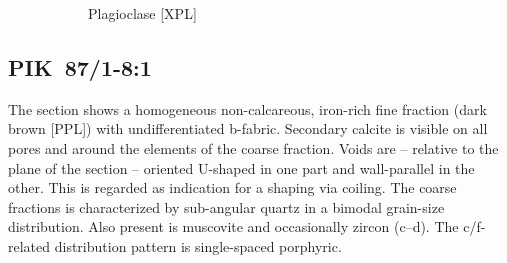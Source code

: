 \documentclass[a4paper]{article}
\begin{document}
\begin{figure}[H]
\begin{subfigure}[t]{.24\textwidth}
		\caption{Plagioclase [XPL]}
	\end{subfigure}
	\caption{}
	\label{fig:4_pik}
\end{figure}

\newpage\subsection{PIK~87/1-8:1 \citep[pik\#5; Fig.~\ref{fig:pik.pottery}.6; cf. Ngbanja style;][428 Pl.~47.20]{Seidensticker.2021e}}

\begin{multicols}{2}
\noindent The section shows a homogeneous non-calcareous, iron-rich fine fraction (dark brown [PPL]) with undifferentiated b-fabric. Secondary calcite is visible on all pores and around the elements of the coarse fraction. Voids are -- relative to the plane of the section -- oriented U-shaped in one part and wall-parallel in the other. This is regarded as indication for a shaping via coiling. The coarse fractions is characterized by sub-angular quartz in  a bimodal grain-size distribution. Also present is muscovite and occasionally zircon (c--d). The c/f-related distribution pattern is single-spaced porphyric.
\end{multicols}

\end{document}
